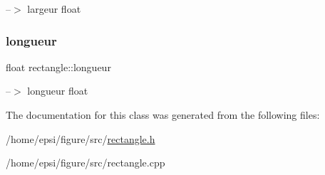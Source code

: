 --$>$ largeur  float \mbox{\label{classrectangle_a323614223c090cf3701e0877ff552328}} 
\subsubsection{\texorpdfstring{longueur}{longueur}}
{\footnotesize\ttfamily float rectangle\+::longueur}

--$>$ longueur  float 

The documentation for this class was generated from the following files\+:\begin{DoxyCompactItemize}
\item 
/home/epsi/figure/src/\hyperlink{rectangle_8h}{rectangle.\+h}\item 
/home/epsi/figure/src/rectangle.\+cpp\end{DoxyCompactItemize}
